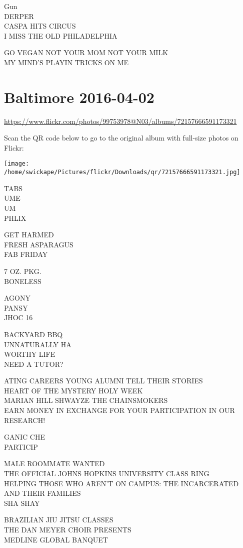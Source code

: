 \documentclass[10pt,letterpaper]{article}
\begin{document}
Gun\\
DERPER\\
CASPA HITS CIRCUS\\
I MISS THE OLD PHILADELPHIA

GO VEGAN NOT YOUR MOM NOT YOUR MILK\\
MY MIND'S PLAYIN TRICKS ON ME


\section*{Baltimore 2016-04-02}

\url{https://www.flickr.com/photos/99753978@N03/albums/72157666591173321}

Scan the QR code below to go to the original album with full-size photos on Flickr:

\texttt{[image: /home/swickape/Pictures/flickr/Downloads/qr/72157666591173321.jpg]}


TABS\\
UME\\
UM\\
PHLIX

GET HARMED\\
FRESH ASPARAGUS\\
FAB FRIDAY

7 OZ. PKG.\\
BONELESS

AGONY\\
PANSY\\
JHOC 16

BACKYARD BBQ\\
UNNATURALLY HA\\
WORTHY LIFE\\
NEED A TUTOR?

ATING CAREERS YOUNG ALUMNI TELL THEIR STORIES\\
HEART OF THE MYSTERY HOLY WEEK\\
MARIAN HILL SHWAYZE THE CHAINSMOKERS\\
EARN MONEY IN EXCHANGE FOR YOUR PARTICIPATION IN OUR RESEARCH!

GANIC CHE\\
PARTICIP

MALE ROOMMATE WANTED\\
THE OFFICIAL JOHNS HOPKINS UNIVERSITY CLASS RING\\
HELPING THOSE WHO AREN'T ON CAMPUS: THE INCARCERATED AND THEIR FAMILIES\\
SHA SHAY

BRAZILIAN JIU JITSU CLASSES\\
THE DAN MEYER CHOIR PRESENTS\\
MEDLINE GLOBAL BANQUET
\end{document}
